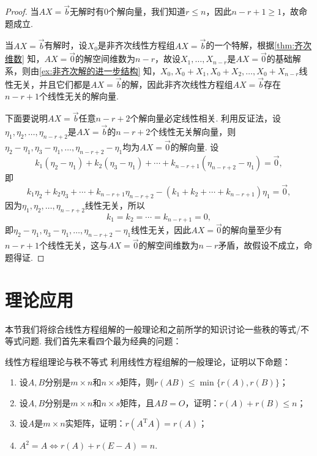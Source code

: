 \begin{proof}
    当$AX=\vec{b}$无解时有0个解向量，我们知道$r\leqslant n$，因此$n-r+1\geqslant 1$，故命题成立.

    当$AX=\vec{b}$有解时，设$X_0$是非齐次线性方程组$AX=\vec{b}$的一个特解，根据\autoref{thm:齐次维数} 知，$AX=\vec{0}$的解空间维数为$n-r$，故设$X_1,\ldots,X_{n-r}$是$AX=\vec{0}$的基础解系，则由\autoref{ex:非齐次解的进一步结构} 知，$X_0,X_0+X_1,X_0+X_2,\ldots,X_0+X_{n-r}$线性无关，并且它们都是$AX=\vec{b}$的解，因此非齐次线性方程组$AX=\vec{b}$存在$n-r+1$个线性无关的解向量.

    下面要说明$AX=\vec{b}$任意$n-r+2$个解向量必定线性相关. 利用反证法，设$\eta_1,\eta_2,\ldots,\eta_{n-r+2}$是$AX=\vec{b}$的$n-r+2$个线性无关解向量，则$\eta_2-\eta_1,\eta_3-\eta_1,\ldots,\eta_{n-r+2}-\eta_1$均为$AX=\vec{0}$的解向量. 设
    \[k_1(\eta_2-\eta_1)+k_2(\eta_3-\eta_1)+\cdots+k_{n-r+1}(\eta_{n-r+2}-\eta_1)=\vec{0},\]
    即
    \[k_1\eta_2+k_2\eta_3+\cdots+k_{n-r+1}\eta_{n-r+2}-(k_1+k_2+\cdots+k_{n-r+1})\eta_1=\vec{0},\]
    因为$\eta_1,\eta_2,\ldots,\eta_{n-r+2}$线性无关，所以
    \[k_1=k_2=\cdots=k_{n-r+1}=0,\]
    即$\eta_2-\eta_1,\eta_3-\eta_1,\ldots,\eta_{n-r+2}-\eta_1$线性无关，因此$AX=\vec{0}$的解向量至少有$n-r+1$个线性无关，这与$AX=\vec{0}$的解空间维数为$n-r$矛盾，故假设不成立，命题得证.
\end{proof}

\section{理论应用}

本节我们将综合线性方程组解的一般理论和之前所学的知识讨论一些秩的等式/不等式问题. 我们首先来看四个最为经典的问题：
\begin{example}{}{线性方程组理论与秩不等式}
    利用线性方程组解的一般理论，证明以下命题：
    \begin{enumerate}
        \item  设$A,B$分别是$m \times n$和$n \times s$矩阵，则$r(AB)\leqslant\min\{r(A),r(B)\}$；

        \item 设$A,B$分别是$m \times n$和$n \times s$矩阵，且$AB=O$，证明：$r(A)+r(B)\leqslant n$；

        \item 设$A$是$m \times n$实矩阵，证明：$r(A^\mathrm{T}A)=r(A)$；

        \item $A^2=A \iff r(A)+r(E-A)=n$.
    \end{enumerate}
\end{example}

